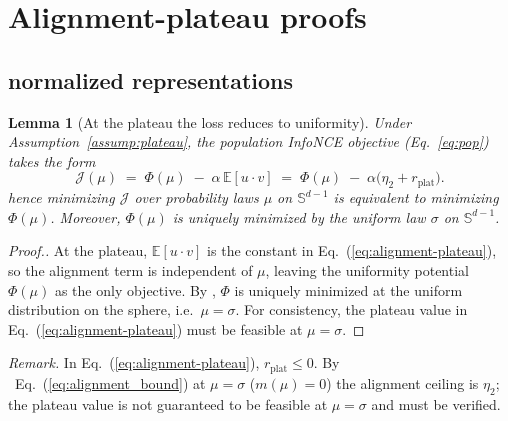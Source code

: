\documentclass{article}
\newtheorem{lemma}{Lemma}
\newcommand{\E}{\mathbb{E}}
\newcommand{\Sph}{\mathbb{S}}
\renewcommand{\eqref}[1]{Eq.~(\ref{#1})}
\newcommand{\peqref}[1]{(Eq.~\ref{#1})}
\begin{document}
\section{Alignment-plateau proofs}
\label{app:plateau_proof}

\subsection{normalized representations}
\label{app:plateau_proof_norm}
\begin{lemma}[At the plateau the loss reduces to uniformity]
\label{lem:reduces-to-uniformity}
Under Assumption~\ref{assump:plateau}, the population InfoNCE objective \peqref{eq:pop} takes the form
\begin{equation}
\label{eq:J-plateau}
\mathcal J(\mu)\;=\;\Phi(\mu)\;-\;\alpha\,\E[u\!\cdot\! v]
\;=\;\Phi(\mu)\;-\;\alpha\big(\eta_2+r_{\mathrm{plat}}\big).
\end{equation}
hence minimizing $\mathcal J$ over probability laws $\mu$ on $\Sph^{d-1}$ is equivalent to minimizing $\Phi(\mu)$.
Moreover, $\Phi(\mu)$ is uniquely minimized by the uniform law $\sigma$ on $\Sph^{d-1}$.
\end{lemma}


\begin{proof}[Proof.]
At the plateau, $\E[u\!\cdot\! v]$ is the constant in \eqref{eq:alignment-plateau}, so the alignment term is independent of $\mu$, leaving the uniformity potential $\Phi(\mu)$ as the only objective.
By \citet[Appendix~A]{wang2020understanding}, $\Phi$ is uniquely minimized at the uniform distribution on the sphere, i.e.\ $\mu=\sigma$. For consistency, the plateau value in \eqref{eq:alignment-plateau} must be feasible at $\mu=\sigma$.
\end{proof}

\emph{Remark.} In \eqref{eq:alignment-plateau}, $r_{\mathrm{plat}} \le 0$. By ~\eqref{eq:alignment_bound} at $\mu = \sigma$ ($m(\mu) = 0$) the alignment ceiling is $\eta_2$; the plateau value is not guaranteed to be feasible at $\mu=\sigma$ and must be verified. 
\end{document}
